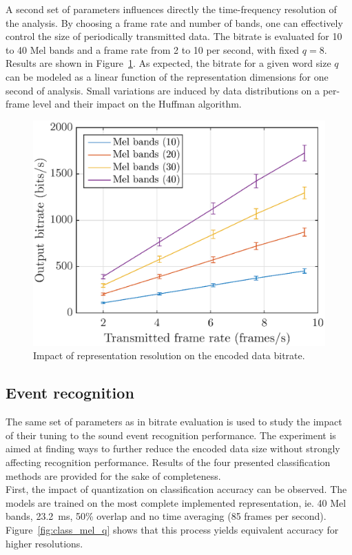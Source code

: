 \documentclass[12pt,times,onecolumn]{article}
\begin{document}
A second set of parameters influences directly the time-frequency resolution of the analysis. By choosing a frame rate and number of bands, one can effectively control the size of periodically transmitted data. The bitrate is evaluated for 10 to 40 Mel bands and a frame rate from 2 to 10 per second, with fixed $q = 8$. Results are shown in Figure~\ref{fig:bitrate_mel_avg}. As expected, the bitrate for a given word size $q$ can be modeled as a linear function of the representation dimensions for one second of analysis. Small variations are induced by data distributions on a per-frame level and their impact on the Huffman algorithm.\\

\begin{figure}[htbp]
	\centering
		\includegraphics[width=0.7\columnwidth]{figures/bitrate_mel_avg.eps}
	\caption{Impact of representation resolution on the encoded data bitrate.}
	\label{fig:bitrate_mel_avg}
\end{figure}


\subsection{Event recognition}

The same set of parameters as in bitrate evaluation is used to study the impact of their tuning to the sound event recognition performance. The experiment is aimed at finding ways to further reduce the encoded data size without strongly affecting recognition performance. Results of the four presented classification methods are provided for the sake of completeness.\\

First, the impact of quantization on classification accuracy can be observed. The models are trained on the most complete implemented representation, ie. 40 Mel bands, 23.2~ms, 50\% overlap and no time averaging (85 frames per second). Figure~\ref{fig:class_mel_q} shows that this process yields equivalent accuracy for higher resolutions.\\
\end{document}
